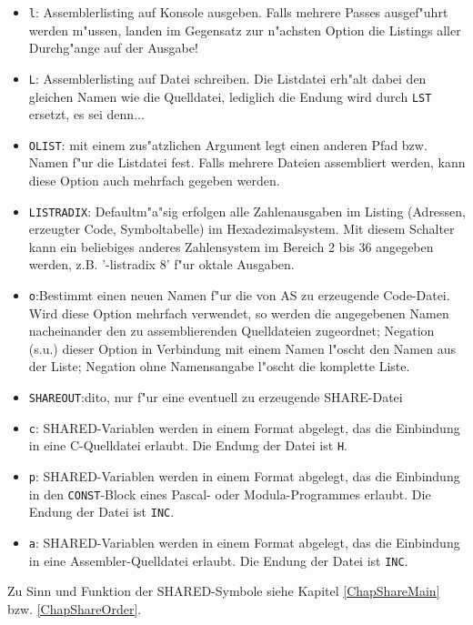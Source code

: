 \documentclass[12pt,a4paper,twoside]{report}
\newcommand{\tty}[1]{{\tt #1}}
\begin{document}
\begin{itemize}
\item{\tty{l}: Assemblerlisting auf Konsole ausgeben.  Falls mehrere
      Passes ausgef"uhrt werden m"ussen, landen im Gegensatz zur
      n"achsten Option die Listings aller Durchg"ange auf der Ausgabe!}
\item{\tty{L}: Assemblerlisting auf Datei schreiben.  Die Listdatei erh"alt
      dabei den gleichen Namen wie die Quelldatei, lediglich die Endung
      wird durch \tty{LST} ersetzt, es sei denn...}
\item{\tty{OLIST}: mit einem zus"atzlichen Argument legt einen anderen
      Pfad bzw. Namen f"ur die Listdatei fest.  Falls mehrere Dateien
      assembliert werden, kann diese Option auch mehrfach gegeben werden.}
\item{\tty{LISTRADIX}: Defaultm"a"sig erfolgen alle Zahlenausgaben im Listing
      (Adressen, erzeugter Code, Symboltabelle) im Hexadezimalsystem.  Mit
      diesem Schalter kann ein beliebiges anderes Zahlensystem im Bereich
      2 bis 36 angegeben werden, z.B. '-listradix 8' f"ur oktale Ausgaben.}
\item{\tty{o}:Bestimmt einen neuen Namen f"ur die von AS zu erzeugende
      Code-Datei.  Wird diese Option mehrfach verwendet, so werden
      die angegebenen Namen nacheinander den zu assemblierenden
      Quelldateien zugeordnet; Negation (s.u.) dieser Option in
      Verbindung mit einem Namen l"oscht den Namen aus der Liste;
      Negation ohne Namensangabe l"oscht die komplette Liste.}
\item{\tty{SHAREOUT}:dito, nur f"ur eine eventuell zu erzeugende
      SHARE-Datei}
\item{\tty{c}: SHARED-Variablen werden in einem Format abgelegt, das die
      Einbindung in eine C-Quelldatei erlaubt.  Die Endung der Datei
      ist \tty{H}.}
\item{\tty{p}: SHARED-Variablen werden in einem Format abgelegt, das die
      Einbindung in den \tty{CONST}-Block eines Pascal- oder Modula-Programmes
      erlaubt.  Die Endung der Datei ist \tty{INC}.}
\item{\tty{a}: SHARED-Variablen werden in einem Format abgelegt, das die
      Einbindung in eine Assembler-Quelldatei erlaubt.  Die Endung
      der Datei ist \tty{INC}.}
\end{itemize}
Zu Sinn und Funktion der SHARED-Symbole siehe Kapitel \ref{ChapShareMain}
bzw. \ref{ChapShareOrder}.
\end{document}
